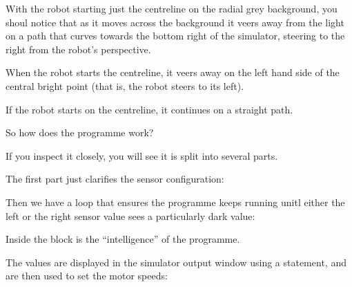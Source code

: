 \documentclass[letterpaper,10pt,english]{sphinxmanual}
\begin{document}
{With the robot starting just  the centreline on the radial grey background, you shoul notice that as it moves across the background it veers away from the light on a path that curves towards the bottom right of the simulator, steering to the right from the robot’s perspective.

When the robot starts  the centreline, it veers away on the left hand side of the central bright point (that is, the robot steers to its left).

If the robot starts on the centreline, it continues on a straight path.

So how does the programme work?

If you inspect it closely, you will see it is split into several parts.

The first part just clarifies the sensor configuration:

\begin{sphinxVerbatim}[commandchars=\\\{\}]
  
  
\end{sphinxVerbatim}

Then we have a  loop that ensures the programme keeps running unitl either the left or the right sensor value sees a particularly dark value:

\begin{sphinxVerbatim}[commandchars=\\\{\}]
 
        
\end{sphinxVerbatim}

Inside the  block is the “intelligence” of the programme.

The values are displayed in the simulator output window using a  statement, and are then used to set the motor speeds:

\begin{sphinxVerbatim}[commandchars=\\\{\}]
  
  


\end{sphinxVerbatim}}
\end{document}
